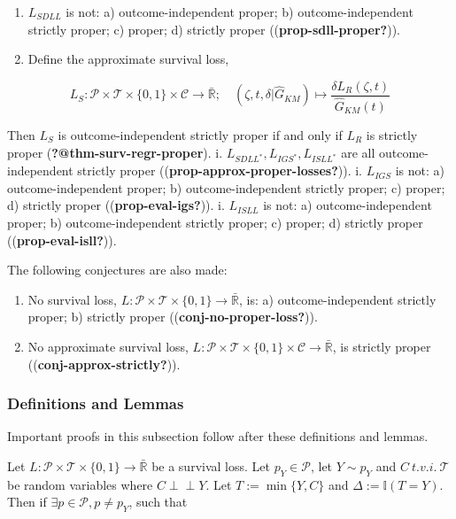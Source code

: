 \documentclass[
  letterpaper,
]{scrbook}
\providecommand{\tightlist}{%
  \setlength{\itemsep}{0pt}\setlength{\parskip}{0pt}}\usepackage{longtable,booktabs,array}
\theoremstyle{plain}
\theoremstyle{definition}
\theoremstyle{remark}
\begin{document}
\begin{enumerate}
\def\labelenumi{\roman{enumi}.}
\tightlist
\item
  \(L_{SDLL}\) is not: a) outcome-independent proper; b)
  outcome-independent strictly proper; c) proper; d) strictly proper
  ((\textbf{prop-sdll-proper?})).
\item
  Define the approximate survival loss,
\end{enumerate}

\[
L_S: \mathcal{P}\times \mathcal{T}\times \{0,1\}\times \mathcal{C}\rightarrow \bar{\mathbb{R}}; \quad
(\zeta, t, \delta|\hat{G}_{KM}) \mapsto \frac{\delta L_R(\zeta, t)}{\hat{G}_{KM}(t)}
\]

Then \(L_S\) is outcome-independent strictly proper if and only if
\(L_R\) is strictly proper (\textbf{?@thm-surv-regr-proper}). i.
\(L_{SDLL^*}, L_{IGS^*}, L_{ISLL^*}\) are all outcome-independent
strictly proper ((\textbf{prop-approx-proper-losses?})). i. \(L_{IGS}\)
is not: a) outcome-independent proper; b) outcome-independent strictly
proper; c) proper; d) strictly proper ((\textbf{prop-eval-igs?})). i.
\(L_{ISLL}\) is not: a) outcome-independent proper; b)
outcome-independent strictly proper; c) proper; d) strictly proper
((\textbf{prop-eval-isll?})).

The following conjectures are also made:

\begin{enumerate}
\def\labelenumi{\roman{enumi}.}
\tightlist
\item
  No survival loss,
  \(L: \mathcal{P}\times \mathcal{T}\times \{0,1\}\rightarrow \bar{\mathbb{R}}\),
  is: a) outcome-independent strictly proper; b) strictly proper
  ((\textbf{conj-no-proper-loss?})).
\item
  No approximate survival loss,
  \(L: \mathcal{P}\times \mathcal{T}\times \{0,1\}\times \mathcal{C}\rightarrow \bar{\mathbb{R}}\),
  is strictly proper ((\textbf{conj-approx-strictly?})).
\end{enumerate}

\hypertarget{definitions-and-lemmas}{%
\subsubsection{Definitions and Lemmas}\label{definitions-and-lemmas}}

Important proofs in this subsection follow after these definitions and
lemmas.

\leavevmode{}%
\label{lem:proper_relate} Let
\(L: \mathcal{P}\times \mathcal{T}\times \{0,1\}\rightarrow \bar{\mathbb{R}}\)
be a survival loss. Let \(p_Y \in \mathcal{P}\), let \(Y \sim p_Y\) and
\(C \ t.v.i. \ \mathcal{T}\) be random variables where
\(C \perp \!\!\! \perp Y\). Let \(T := \min\{Y,C\}\) and
\(\Delta := \mathbb{I}(T=Y)\). Then if
\(\exists p \in \mathcal{P}, p \neq p_Y\), such that
\end{document}

